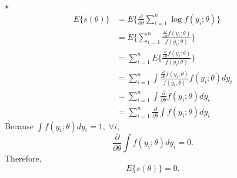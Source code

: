 \documentclass[11pt]{article}
\newcommand{\jie}{$\star$ }
\begin{document}
\begin{enumerate}[(A)]
\bigskip
\jie
\begin{align*}
    E\{s(\theta)\} &= E\{ \frac{\partial}{\partial \theta} \sum_{i=1}^n \log f(y_i;\theta) \} \\
    &= E\{ \sum_{i=1}^n \frac{\frac{\partial}{\partial \theta}f(y_i;\theta)}{f(y_i;\theta)} \} \\
    &= \sum_{i=1}^n E\{\frac{\frac{\partial}{\partial \theta}f(y_i;\theta)}{f(y_i;\theta)} \} \\
    &= \sum_{i=1}^n \int \frac{\frac{\partial}{\partial \theta}f(y_i;\theta)}{f(y_i;\theta)} f(y_i;\theta) dy_i\\
    &= \sum_{i=1}^n \int \frac{\partial}{\partial \theta}f(y_i;\theta) dy_i \\
    &= \sum_{i=1}^n \frac{\partial}{\partial \theta} \int f(y_i;\theta) dy_i
\end{align*}
Because $\int f(y_i;\theta) dy_i  = 1, \; \forall i$, 
$$\frac{\partial}{\partial \theta} \int f(y_i;\theta) dy_i = 0.$$
Therefore,
$$E\{s(\theta)\} = 0.$$


\end{enumerate}
\end{document}
